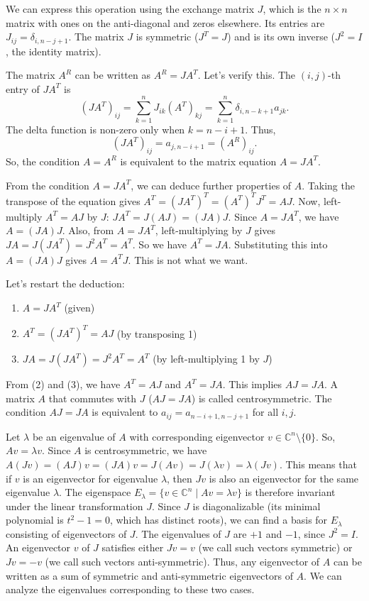 \documentclass[12pt,a4paper]{article}
\theoremstyle{definition}
\begin{document}
        We can express this operation using the exchange matrix $J$, which is the $n \times n$ matrix with ones on the anti-diagonal and zeros elsewhere. Its entries are $J_{ij} = \delta_{i, n-j+1}$. The matrix $J$ is symmetric ($J^T=J$) and is its own inverse ($J^2=I$, the identity matrix).

        The matrix $A^R$ can be written as $A^R = JA^T$. Let's verify this.
        The $(i,j)$-th entry of $JA^T$ is
        $$(JA^T)_{ij} = \sum_{k=1}^n J_{ik} (A^T)_{kj} = \sum_{k=1}^n \delta_{i, n-k+1} a_{jk}.$$
        The delta function is non-zero only when $k=n-i+1$. Thus,
        $$(JA^T)_{ij} = a_{j, n-i+1} = (A^R)_{ij}.$$
        So, the condition $A=A^R$ is equivalent to the matrix equation $A = JA^T$.

        From the condition $A=JA^T$, we can deduce further properties of $A$.
        Taking the transpose of the equation gives $A^T = (JA^T)^T = (A^T)^T J^T = AJ$.
        Now, left-multiply $A^T=AJ$ by $J$: $JA^T = J(AJ) = (JA)J$.
        Since $A=JA^T$, we have $A = (JA)J$.
        Also, from $A=JA^T$, left-multiplying by $J$ gives $JA = J(JA^T) = J^2 A^T = A^T$.
        So we have $A^T = JA$. Substituting this into $A=(JA)J$ gives $A = A^T J$. This is not what we want.

        Let's restart the deduction:
        \begin{enumerate}
            \item $A = JA^T$ (given)
            \item $A^T = (JA^T)^T = AJ$ (by transposing 1)
            \item $JA = J(JA^T) = J^2 A^T = A^T$ (by left-multiplying 1 by $J$)
        \end{enumerate}

        From (2) and (3), we have $A^T = AJ$ and $A^T = JA$. This implies $AJ=JA$.
        A matrix $A$ that commutes with $J$ ($AJ=JA$) is called centrosymmetric. The condition $AJ=JA$ is equivalent to $a_{ij} = a_{n-i+1, n-j+1}$ for all $i,j$.

        Let $\lambda$ be an eigenvalue of $A$ with corresponding eigenvector $v \in \mathbb{C}^n \setminus \{0\}$. So, $Av = \lambda v$.
        Since $A$ is centrosymmetric, we have $A(Jv) = (AJ)v = (JA)v = J(Av) = J(\lambda v) = \lambda(Jv)$.
        This means that if $v$ is an eigenvector for eigenvalue $\lambda$, then $Jv$ is also an eigenvector for the same eigenvalue $\lambda$.
        The eigenspace $E_\lambda = \{ v \in \mathbb{C}^n \mid Av = \lambda v \}$ is therefore invariant under the linear transformation $J$.
        Since $J$ is diagonalizable (its minimal polynomial is $t^2-1=0$, which has distinct roots), we can find a basis for $E_\lambda$ consisting of eigenvectors of $J$.
        The eigenvalues of $J$ are $+1$ and $-1$, since $J^2=I$.
        An eigenvector $v$ of $J$ satisfies either $Jv=v$ (we call such vectors symmetric) or $Jv=-v$ (we call such vectors anti-symmetric).
        Thus, any eigenvector of $A$ can be written as a sum of symmetric and anti-symmetric eigenvectors of $A$. We can analyze the eigenvalues corresponding to these two cases.
\end{document}
